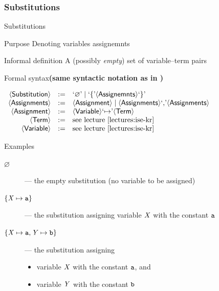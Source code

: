 \documentclass[presentation]{beamer}\mode<presentation>{\usetheme{AMSBolognaFC}}
\begin{document}
\subsubsection{Substitutions}

\begin{frame}[allowframebreaks]{Substitutions}
    \begin{block}{Purpose}\centering
        Denoting variables assignemnts
    \end{block}
    \begin{block}{Informal definition}
        A (possibly \emph{empty}) set of \alert{variable--term} pairs
    \end{block}
    \begin{alertblock}{Formal syntax\hfill\textbf{\footnotesize(same syntactic notation as in \cite{lectures:ise-kr})}}
        \begin{center}
            $\begin{array}{rcl}
                \mathsf{\left\langle Substitution\right\rangle} & := & \text{`}\mathit{\varnothing}\text{'} \mid \text{`}\mathit{\{}\text{'} \mathsf{\left\langle Assignemnts\right\rangle} \text{`}\mathit{\}}\text{'}
                \\
                \mathsf{\left\langle Assignments\right\rangle} & := & \mathsf{\left\langle Assignment\right\rangle} \mid \mathsf{\left\langle Assignments\right\rangle} \text{`}\mathit{,}\text{'} \mathsf{\left\langle Assignments\right\rangle}
                \\
                \mathsf{\left\langle Assignment\right\rangle} & := & \mathsf{\left\langle Variable\right\rangle} \text{`}\mathit{\mapsto}\text{'} \mathsf{\left\langle Term\right\rangle}
                \\
                \mathsf{\left\langle Term\right\rangle} & := & \text{see lecture \cite{lectures:ise-kr}}
                \\
                \mathsf{\left\langle Variable\right\rangle} & := & \text{see lecture \cite{lectures:ise-kr}}
            \end{array}$
        \end{center}
    \end{alertblock}

    \begin{exampleblock}{Examples}
        \begin{description}
            \item[$\varnothing$] --- the empty substitution (no variable to be assigned)
            \item[$\{ \mathit{X} \mapsto \mathtt{a} \}$] --- the substitution assigning variable $\mathit{X}$ with the constant $\mathtt{a}$
            \item[$\{ \mathit{X} \mapsto \mathtt{a}, \mathit{Y} \mapsto \mathtt{b} \}$] --- the substitution assigning 
            \begin{itemize}
                \item variable $\mathit{X}$ with the constant $\mathtt{a}$, and
                \item variable $\mathit{Y}$ with the constant $\mathtt{b}$ 
            \end{itemize} 
        \end{description}
    \end{exampleblock}
\end{frame}
\end{document}
